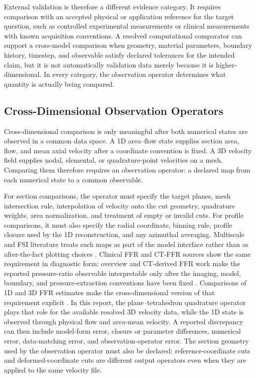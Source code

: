 External validation is therefore a different evidence category. It requires
comparison with an accepted physical or application reference for the target
question, such as controlled experimental measurements or clinical measurements
with known acquisition conventions. A resolved computational comparator can
support a cross-model comparison when geometry, material parameters, boundary
history, timestep, and observable satisfy declared tolerances for the intended
claim, but it is not automatically validation data merely because it is
higher-dimensional. In every category, the observation operator determines what
quantity is actually being compared.

\subsection{Cross-Dimensional Observation Operators}
\label{subsec:numerical-methods-observation-operators}

Cross-dimensional comparison is only meaningful after both numerical states are
observed in a common data space. A 1D
area--flow state supplies section area, flow, and mean axial velocity after a
coordinate convention is fixed. A 3D velocity field supplies nodal, elemental, or
quadrature-point velocities on a mesh. Comparing them therefore requires an
observation operator: a declared map from each numerical state to a common
observable.

For section comparisons, the operator must specify the target planes, mesh
intersection rule, interpolation of velocity onto the cut geometry, quadrature
weights, area normalization, and treatment of empty or invalid cuts. For profile
comparisons, it must also specify the radial coordinate, binning rule, profile
closure used by the 1D reconstruction, and any azimuthal averaging. Multiscale
and FSI literature treats such maps as part of the model interface rather than
as after-the-fact plotting choices
\cite{FormaggiaEtAl2007FSICoupling,QuarteroniVeneziani2003GeometricalMultiscale}.
Clinical FFR and CT-FFR sources show the same requirement in diagnostic form:
overview and CT-derived FFR work make the reported pressure-ratio observable
interpretable only after the imaging, model, boundary, and pressure-extraction
conventions have been fixed
\cite{TebaldiEtAl2015FFROverview,NorgaardEtAl2014NXTFFRCT,ShaikhEtAl2025CTFFR}.
Comparisons of 1D and 3D FFR estimates make the cross-dimensional version of
that requirement explicit \cite{Blanco2018FFR1D3D}.
In this report, the plane--tetrahedron quadrature operator plays that role for
the available resolved 3D velocity data, while the 1D state is observed through
physical flow and area-mean velocity.
A reported discrepancy can then include model-form error, closure or parameter
differences, numerical error, data-matching error, and observation-operator
error. The section geometry used by the observation operator must also be declared:
reference-coordinate cuts and deformed-coordinate cuts are different output
operators even when they are applied to the same velocity file.

